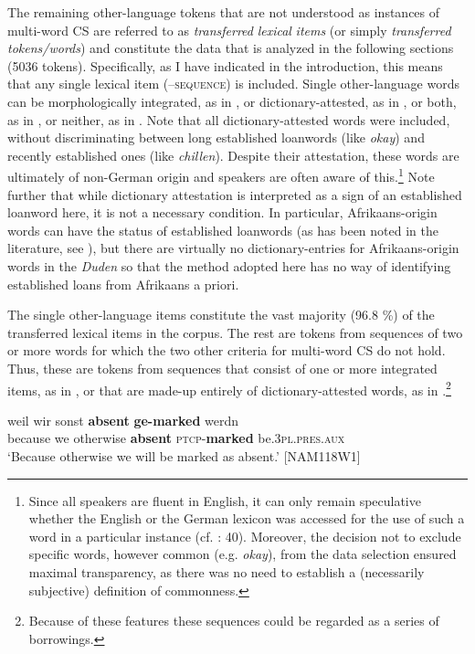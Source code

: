 \documentclass[output=paper]{langsci/langscibook}
\begin{document}
The remaining other-language tokens that are not understood as instances of multi-word CS are referred to as \textit{transferred} \textit{lexical} \textit{items} (or simply \textit{transferred} \textit{tokens/words}) and constitute the data that is analyzed in the following sections (5036 tokens). Specifically, as I have indicated in the introduction, this means that any single lexical item (–⁠\textsc{sequence}) is included. Single other-language words can be morphologically integrated, as in , or dictionary-attested, as in , or both, as in , or neither, as in . Note that all dictionary-attested words were included, without discriminating between long established loanwords (like \textit{okay}) and recently established ones (like \textit{chillen}). Despite their attestation, these words are ultimately of non-German origin and speakers are often aware of this.\footnote{Since all speakers are fluent in English, it can only remain speculative whether the English or the German lexicon was accessed for the use of such a word in a particular instance (cf. \citealt{haspelmath_lexical_2009}: 40). Moreover, the decision not to exclude specific words, however common (e.g. \textit{okay}), from the data selection ensured maximal transparency, as there was no need to establish a (necessarily subjective) definition of commonness.} Note further that while dictionary attestation is interpreted as a sign of an established loanword here, it is not a necessary condition. In particular, Afrikaans-origin words can have the status of established loanwords (as has been noted in the literature, see ), but there are virtually no dictionary-entries for Afrikaans-origin words in the \textit{Duden} so that the method adopted here has no way of identifying established loans from Afrikaans a priori.

The single other-language items constitute the vast majority (96.8 \%) of the transferred lexical items in the corpus. The rest are tokens from sequences of two or more words for which the two other criteria for multi-word CS do not hold. Thus, these are tokens from sequences that consist of one or more integrated items, as in , or that are made-up entirely of dictionary-attested words, as in .\footnote{Because of these features these sequences could be regarded as a series of borrowings.}

\ea
\label{ex:bracke:4}
\gll weil wir sonst \textbf{absent} \textbf{ge-marked} werdn\\
     because we otherwise \textbf{absent} \textsc{ptcp-}\textbf{marked} be.\textsc{3pl.pres.aux}\\
\glt `Because otherwise we will be marked as absent.' {[}NAM118W1{]}
\z
\end{document}
